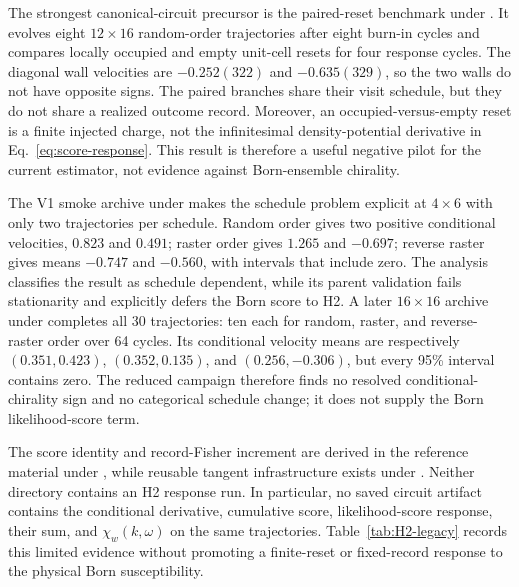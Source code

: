 \documentclass[aps,prx,twocolumn,floatfix,nofootinbib,superscriptaddress,longbibliography]{revtex4-2}
\begin{document}
The strongest canonical-circuit precursor is the paired-reset benchmark under
.  It evolves eight $12\times16$ random-order trajectories
after eight burn-in cycles and compares locally occupied and empty unit-cell resets for four
response cycles.  The diagonal wall velocities are $-0.252(322)$ and $-0.635(329)$, so the
two walls do not have opposite signs.  The paired branches share their visit schedule, but
they do not share a realized outcome record.  Moreover, an occupied-versus-empty reset is
a finite injected charge, not the infinitesimal density-potential derivative in
Eq.~\eqref{eq:score-response}.  This result is therefore a useful negative pilot for the
current estimator, not evidence against Born-ensemble chirality.

The V1 smoke archive under
 makes the schedule
problem explicit at $4\times6$ with only two trajectories per schedule.  Random order gives
two positive conditional velocities, $0.823$ and $0.491$; raster order gives
$1.265$ and $-0.697$; reverse raster gives means $-0.747$ and $-0.560$, with intervals that
include zero.  The analysis classifies the result as schedule dependent, while its parent
validation fails stationarity and explicitly defers the Born score to H2.  A later
$16\times16$ archive under 
completes all 30 trajectories: ten each for random, raster, and reverse-raster order over
64 cycles.  Its conditional velocity means are respectively
$(0.351,0.423)$, $(0.352,0.135)$, and $(0.256,-0.306)$, but every 95\% interval contains
zero.  The reduced campaign therefore finds no resolved conditional-chirality sign and no
categorical schedule change; it does not supply the Born likelihood-score term.

The score identity and record-Fisher increment are derived in the reference material under
, while reusable tangent infrastructure exists under
.  Neither directory contains an H2 response run.  In
particular, no saved circuit artifact contains the conditional derivative, cumulative
score, likelihood-score response, their sum, and $\chi_w(k,\omega)$ on the same trajectories.
Table~\ref{tab:H2-legacy} records this limited evidence without promoting a finite-reset or
fixed-record response to the physical Born susceptibility.
\end{document}
